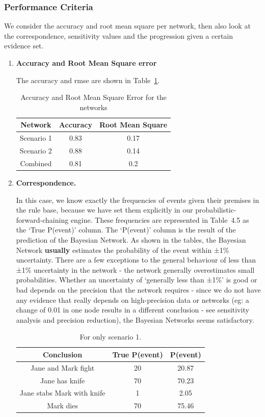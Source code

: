 \subsubsection{Performance Criteria}
We consider the accuracy and root mean square per network, then also look at the correspondence, sensitivity values and the progression given a certain evidence set.

\begin{enumerate}
\item \textbf{Accuracy and Root Mean Square error}

The accuracy and rmse are shown in Table~\ref{tabA}.

\begin{table}[h]
\begin{center}
\begin{tabular}{|c|c|c|}
 \hline
 Network & Accuracy & Root Mean Square\\
 \hline
 Scenario 1   & 0.83 &  0.17   \\
 Scenario 2 & 0.88 & 0.14 \\
 Combined & 0.81 & 0.2 \\
\hline
\end{tabular}
\caption{Accuracy and Root Mean Square Error for the networks}
\label{tabA}
\end{center}
\end{table}

\item \textbf{Correspondence.}

In this case, we know exactly the frequencies of events given their premises in the rule base, because we have set them explicitly in our probabilistic-forward-chaining engine. These frequencies are represented in Table~4.5 as the `True P(event)' column. The `P(event)' column is the result of the prediction of the Bayesian Network. As shown in the tables, the Bayesian Network \textbf{usually} estimates the probability of the event within ±1\% uncertainty. There are a few exceptions to the general behaviour of less than ±1\% uncertainty in the network - the network generally overestimates small probabilities. Whether an uncertainty of `generally less than ±1\%' is good or bad depends on the precision that the network requires - since we do not have any evidence that really depends on high-precision data or networks (eg: a change of 0.01 in one node results in a different conclusion - see sensitivity analysis and precision reduction), the Bayesian Networks seems satisfactory. 


\begin{table}
\begin{center}
\begin{tabular}{|c|c|c|}
 \hline
 Conclusion & True P(event) & P(event) \\
 \hline
 Jane and Mark fight   & 20 &  20.87   \\
 Jane has knife & 70 & 70.23 \\
 Jane stabs Mark with knife & 1 & 2.05 \\
 Mark dies & 70 & 75.46 \\ 
\hline
\end{tabular}
\caption{For only scenario 1.}


\end{center}
\end{table}
\end{enumerate}
